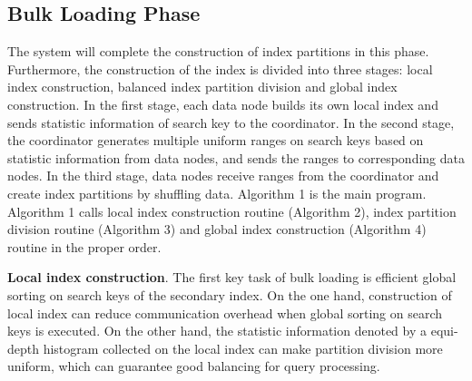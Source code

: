 \subsection{Bulk Loading Phase}
The system will complete the construction of index partitions in this phase. Furthermore, the construction of the index is divided into three stages: local index construction, balanced index partition division and global index construction. In the first stage, each data node builds its own local index and sends statistic information of search key to the coordinator. In the second stage, the coordinator generates multiple uniform ranges on search keys based on statistic information from data nodes, and sends the ranges to corresponding data nodes. In the third stage, data nodes receive ranges from the coordinator and create index partitions by shuffling data. Algorithm 1 is the main program. Algorithm 1 calls local index construction routine (Algorithm 2), index partition division routine (Algorithm 3) and global index construction (Algorithm 4) routine in the proper order.

\textbf{Local index construction}.
The first key task of bulk loading is efficient global sorting on search keys of the secondary index. %
On the one hand, construction of local index can reduce communication overhead when global sorting on search keys is executed.
On the other hand, the statistic information denoted by a equi-depth histogram collected on the local index can make partition division more uniform, which can guarantee good balancing for query processing.




